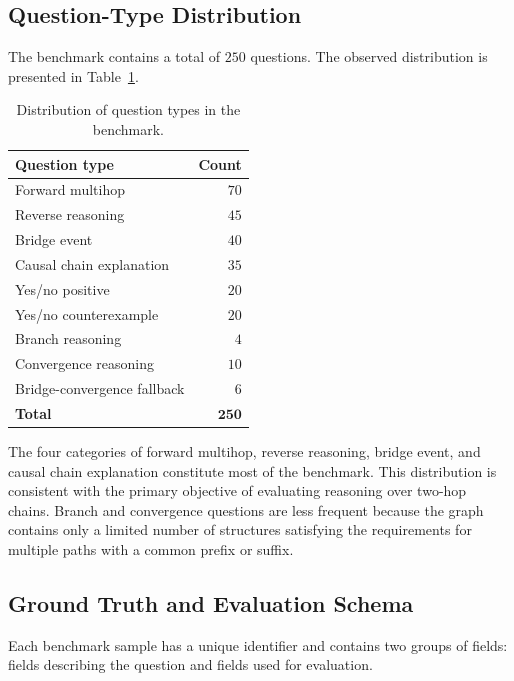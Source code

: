\subsection{Question-Type Distribution}

The benchmark contains a total of \(250\) questions. The observed distribution
is presented in Table~\ref{tab:benchmark}.

\begin{table}[t]
    \centering
    \caption{Distribution of question types in the benchmark.}
    \label{tab:benchmark}
    \begin{tabular}{lr}
        \hline
        \textbf{Question type} & \textbf{Count} \\
        \hline
        Forward multihop & \(70\) \\
        Reverse reasoning & \(45\) \\
        Bridge event & \(40\) \\
        Causal chain explanation & \(35\) \\
        Yes/no positive & \(20\) \\
        Yes/no counterexample & \(20\) \\
        Branch reasoning & \(4\) \\
        Convergence reasoning & \(10\) \\
        Bridge-convergence fallback & \(6\) \\
        \hline
        \textbf{Total} & \(\mathbf{250}\) \\
        \hline
    \end{tabular}
\end{table}

The four categories of forward multihop, reverse reasoning, bridge event, and
causal chain explanation constitute most of the benchmark. This distribution
is consistent with the primary objective of evaluating reasoning over two-hop
chains. Branch and convergence questions are less frequent because the graph
contains only a limited number of structures satisfying the requirements for
multiple paths with a common prefix or suffix.

\subsection{Ground Truth and Evaluation Schema}

Each benchmark sample has a unique identifier and contains two groups of
fields: fields describing the question and fields used for evaluation.


